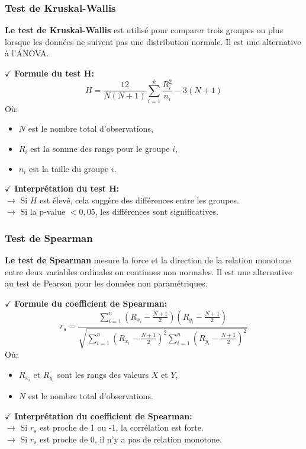 \subsubsection{Test de Kruskal-Wallis}

\textbf{Le test de Kruskal-Wallis} est utilisé pour comparer trois groupes ou plus lorsque les données ne suivent pas une distribution normale. Il est une alternative à l'ANOVA.

\textbf{\(\checkmark\)} \textbf{Formule du test H:}
\[
H = \frac{12}{N(N+1)} \sum_{i=1}^{k} \frac{R_i^2}{n_i} - 3(N+1)
\]
Où:
\begin{itemize}
    \item \( N \) est le nombre total d'observations,
    \item \( R_i \) est la somme des rangs pour le groupe \( i \),
    \item \( n_i \) est la taille du groupe \( i \).
\end{itemize}

\textbf{\(\checkmark\)} \textbf{Interprétation du test H:}\\
    \textbf{\(\rightarrow\)} Si \( H \) est élevé, cela suggère des différences entre les groupes.\\
    \textbf{\(\rightarrow\)} Si la p-value \( < 0{,}05 \), les différences sont significatives.

\subsubsection{Test de Spearman}

\textbf{Le test de Spearman} mesure la force et la direction de la relation monotone entre deux variables ordinales ou continues non normales. Il est une alternative au test de Pearson pour les données non paramétriques.

\textbf{\(\checkmark\)} \textbf{Formule du coefficient de Spearman:}
\[
r_s = \frac{\sum_{i=1}^{n} (R_{x_i} - \frac{N+1}{2})(R_{y_i} - \frac{N+1}{2})}{\sqrt{\sum_{i=1}^{n} (R_{x_i} - \frac{N+1}{2})^2 \sum_{i=1}^{n} (R_{y_i} - \frac{N+1}{2})^2}}
\]
Où:
\begin{itemize}
    \item \( R_{x_i} \) et \( R_{y_i} \) sont les rangs des valeurs \( X \) et \( Y \),
    \item \( N \) est le nombre total d'observations.
\end{itemize}

\textbf{\(\checkmark\)} \textbf{Interprétation du coefficient de Spearman:}\\
    \textbf{\(\rightarrow\)} Si \( r_s \) est proche de 1 ou -1, la corrélation est forte.\\
    \textbf{\(\rightarrow\)} Si \( r_s \) est proche de 0, il n'y a pas de relation monotone.

